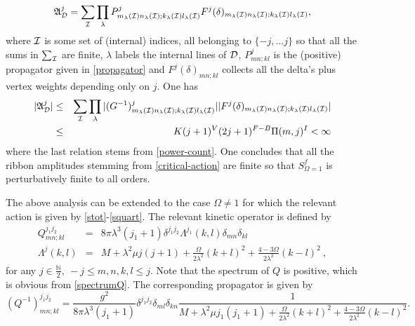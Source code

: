 \documentclass[a4paper,11pt,twoside]{article}
\numberwithin{equation}{section}
\theoremstyle{nonumberplain}
\newcounter{and}
\begin{document}
%
\begin{equation}
\mathfrak{A}^j_{{\cal{D}}}=\sum_{{\cal{I}}}\prod_\lambda P^j_{m_\lambda({\cal{I}}) n_\lambda({\cal{I}});k_\lambda({\cal{I}}) l_\lambda({\cal{I}})}F^j(\delta)_{m_\lambda({\cal{I}}) n_\lambda({\cal{I}});k_\lambda({\cal{I}}) l_\lambda({\cal{I}})},\label{amplit-arb}
\end{equation}
%
where ${\cal{I}}$ is some set of (internal) indices, all belonging to $\{-j,...j\}$ so that all the sums in $\sum_{{\cal{I}}}$ are finite, $\lambda$ labels the internal lines of ${\cal{D}}$, $P^j_{mn;kl}$ is the (positive) propagator given in \eqref{propagator} and $F^j(\delta)_{mn;kl}$ collects all the delta's plus vertex weights depending only on $j$. One has%
%
\begin{eqnarray}
\vert\mathfrak{A}^j_{{\cal{D}}}\vert&\le&\sum_{{\cal{I}}}\prod_\lambda\vert(G^{-1})^j_{m_\lambda({\cal{I}}) n_\lambda({\cal{I}});k_\lambda({\cal{I}}) l_\lambda({\cal{I}})} \vert\vert F^j(\delta)_{m_\lambda({\cal{I}}) n_\lambda({\cal{I}});k_\lambda({\cal{I}}) l_\lambda({\cal{I}})} \vert\nonumber \\ 
&\le& K(j+1)^V(2j+1)^{F-B}\Pi(m,j)^I<\infty
\end{eqnarray}
%
where the last relation stems from \eqref{power-count}. One concludes that all the ribbon amplitudes stemming from \eqref{critical-action} are finite so that $S^f_{\Omega=1}$ is perturbatively finite to all orders.\par%
%
The above analysis can be extended to the case $\Omega\ne1$ for which the relevant action is given by \eqref{stot}-\eqref{squart}. The relevant kinetic operator is defined by%
%
\begin{eqnarray}
Q^{j_1j_2}_{mn;kl} &=& 8\pi\lambda^3 (j_1+1) \delta^{j_1j_2} \Lambda^{j_1}(k,l)\delta_{mn}\delta_{kl}\label{propaQ} \\
\Lambda^{j}(k,l)&=& M+\lambda^2\mu j(j+1)+\frac{\Omega}{2\lambda^2}(k+l)^2+\frac{4-3\Omega}{2\lambda^2}(k-l)^2 \ , \label{spectrumQ}
\end{eqnarray}
%
for any $j\in\frac{\mathbb{N}}{2},\ -j\le m,n,k,l\le j$. Note that the spectrum of $Q$ is positive, which is obvious from \eqref{spectrumQ}. The corresponding propagator is given by%
%
\begin{equation}
(Q^{-1})^{j_1j_2}_{mn;kl}=\frac{g^2}{8\pi\lambda^3(j_1+1)}\delta^{j_1j_2}\delta_{ml}\delta_{kn}\frac{1}{M+\lambda^2\mu j_1(j_1+1)+\frac{\Omega}{2\lambda^2}(k+l)^2+\frac{4-3\Omega}{2\lambda^2}(k-l)^2}\label{q-1}.
\end{equation}
%
\end{document}
